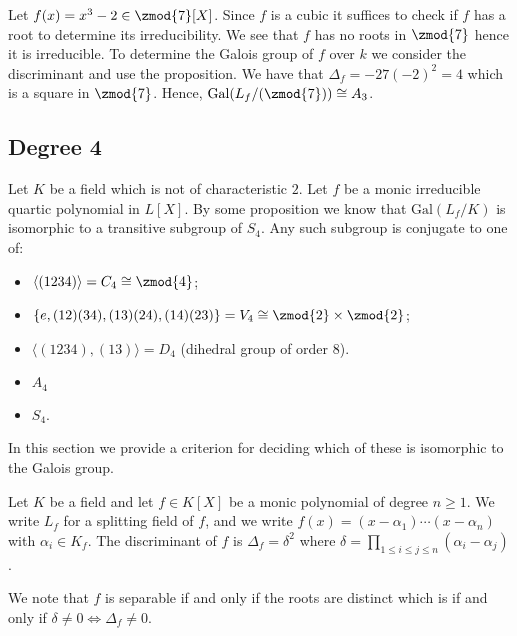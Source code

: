 \documentclass[12pt, a4paper]{article}
\newcommand{\gal}{\text{Gal}}
\begin{document}
\begin{mdexample}
    Let \(f(x) =x^3-2 \in \zmod{7}[X]\). Since \(f\) is a cubic it suffices to check if \(f\) has a root to determine its irreducibility. We see that \(f\) has no roots in \(\zmod{7}\) hence it is irreducible. To determine the Galois group of \(f\) over \(k\) we consider the discriminant and use the proposition. We have that \(\Delta_f = -27(-2)^2=4\) which is a square in \(\zmod{7}\). Hence, \(\gal(L_f/(\zmod{7})) \cong A_3\).
\end{mdexample}

\subsection{Degree 4}

Let \(K\) be a field which is not of characteristic \(2\). Let \(f\) be a monic irreducible quartic polynomial in \(L[X]\). By some proposition we know that \(\gal(L_f/K)\) is isomorphic to a transitive subgroup of \(S_4\). Any such subgroup is conjugate to one of:
\begin{itemize}
    \item \(\langle (1234) \rangle = C_4 \cong \zmod{4}\);
    \item \(\left\{ e,(12)(34),(13)(24),(14)(23) \right\} = V_4 \cong \zmod{2} \times \zmod{2}\);
    \item \(\langle (1234),(13)\rangle = D_4\) (dihedral group of order \(8\)).
    \item \(A_4\)
    \item \(S_4\).
\end{itemize}

\begin{mdnote}
    In this section we provide a criterion for deciding which of these is isomorphic to the Galois group.
\end{mdnote}

\begin{definition}
    Let \(K\) be a field and let \(f\in K[X]\) be a monic polynomial of degree \(n\geq 1\). We write \(L_f\) for a splitting field of \(f\), and we write \(f(x)=(x-\alpha_1)\cdots(x-\alpha_n)\) with \(\alpha_i \in K_f\). The discriminant of \(f\) is \(\Delta_f = \delta^2\) where \(\delta = \prod_{1\leq i\leq j \leq n} (\alpha_i-\alpha_j)\). 
\end{definition}

\begin{proposition}
    We note that \(f\) is separable if and only if the roots are distinct which is if and only if \(\delta\neq 0 \iff \Delta_f\neq0\).
\end{proposition}
\end{document}
